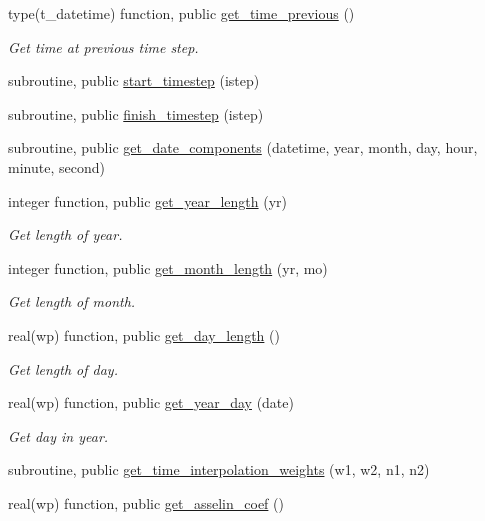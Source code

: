 \begin{DoxyCompactItemize}
type(t\+\_\+datetime) function, public \hyperlink{namespacemo__jsb__time__iface_aa475436175297ff2a5f9969a176d17da}{get\+\_\+time\+\_\+previous} ()
\begin{DoxyCompactList}\small\item\em Get time at previous time step. \end{DoxyCompactList}\item 
subroutine, public \hyperlink{namespacemo__jsb__time__iface_a01e05b9838b013ea37b6bd5f9e446ce6}{start\+\_\+timestep} (istep)
\item 
subroutine, public \hyperlink{namespacemo__jsb__time__iface_a6f035dd414c8b19cde3a73e39f6afa3a}{finish\+\_\+timestep} (istep)
\item 
subroutine, public \hyperlink{namespacemo__jsb__time__iface_aefc6d88ce2a25c59f0931865095f217b}{get\+\_\+date\+\_\+components} (datetime, year, month, day, hour, minute, second)
\item 
integer function, public \hyperlink{namespacemo__jsb__time__iface_a4e7bdc2a98bd137115b6b270439065b0}{get\+\_\+year\+\_\+length} (yr)
\begin{DoxyCompactList}\small\item\em Get length of year. \end{DoxyCompactList}\item 
integer function, public \hyperlink{namespacemo__jsb__time__iface_a443c83592d475f0832e0147783a960ba}{get\+\_\+month\+\_\+length} (yr, mo)
\begin{DoxyCompactList}\small\item\em Get length of month. \end{DoxyCompactList}\item 
real(wp) function, public \hyperlink{namespacemo__jsb__time__iface_a53e5fa510aa754954b65b557be123be4}{get\+\_\+day\+\_\+length} ()
\begin{DoxyCompactList}\small\item\em Get length of day. \end{DoxyCompactList}\item 
real(wp) function, public \hyperlink{namespacemo__jsb__time__iface_a9b807c3d9aa14da6ed98308332014a52}{get\+\_\+year\+\_\+day} (date)
\begin{DoxyCompactList}\small\item\em Get day in year. \end{DoxyCompactList}\item 
subroutine, public \hyperlink{namespacemo__jsb__time__iface_a4de628dda235839b578e82755b9b98ab}{get\+\_\+time\+\_\+interpolation\+\_\+weights} (w1, w2, n1, n2)
\item 
real(wp) function, public \hyperlink{namespacemo__jsb__time__iface_ac63a5305338faddee24202e1798bcf93}{get\+\_\+asselin\+\_\+coef} ()
\end{DoxyCompactItemize}
